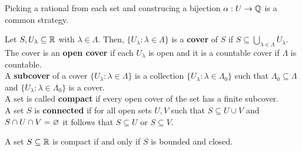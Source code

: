 \begin{remark}
	Picking a rational from each set and construcing a bijection \(\alpha: U \to \mathbb{Q}\) is a common strategy.
\end{remark}
\begin{definition}[Compactness]
Let \(S, U_{\lambda} \subseteq \mathbb{R}\) with \(\lambda \in \Lambda\). Then, \(\{U_{\lambda}: \lambda \in \Lambda\} \) is a \textbf{cover} of \(S\) if \(S \subseteq \bigcup_{\lambda \in \Lambda} U_{\lambda}\). The cover is an \textbf{open cover} if each \(U_{\lambda}\) is open and it is a countable cover if \(\Lambda\) is countable.\\
A \textbf{subcover} of a cover \(\{U_{\lambda} :  \lambda \in \Lambda\} \) is a collection \(\{ U_{\lambda} : \lambda \in \Lambda_{0}\} \) such that \(\Lambda_{0} \subseteq \Lambda\) and \(\{U_{\lambda} : \lambda \in \Lambda_{0}\} \) is a cover.\\
A set is called \textbf{compact} if every open cover of the set has a finite subcover.\\
A set \(S\) is \textbf{connected} if for all open sets \(U, V \) such that \(S \subseteq U \cup V\) and \(S\cap U \cap V = \varnothing\) it follows that \(S \subseteq U\) or \(S \subseteq V\).
\end{definition}
\begin{theorem}
	A set \(S \subseteq \mathbb{R}\) is compact if and only if \(S\) is bounded and closed.
\end{theorem}
